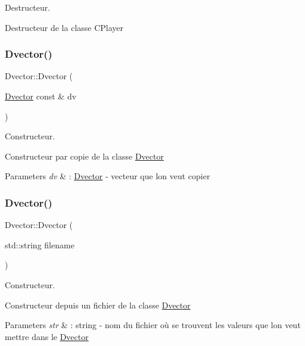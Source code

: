 Destructeur. 

Destructeur de la classe C\+Player \hypertarget{class_dvector_a7040a6dc6feb57dd2c5b7033c00e5de5}{}\label{class_dvector_a7040a6dc6feb57dd2c5b7033c00e5de5} 
\subsubsection{\texorpdfstring{Dvector()}{Dvector()}\hspace{0.1cm}{\footnotesize\ttfamily [2/3]}}
{\footnotesize\ttfamily Dvector\+::\+Dvector (\begin{DoxyParamCaption}\item[{\hyperlink{class_dvector}{Dvector} const \&}]{dv }\end{DoxyParamCaption})}



Constructeur. 

Constructeur par copie de la classe \hyperlink{class_dvector}{Dvector}


\begin{DoxyParams}{Parameters}
{\em dv} & \+: \hyperlink{class_dvector}{Dvector} -\/ vecteur que l\textquotesingle{}on veut copier \\
\hline
\end{DoxyParams}
\hypertarget{class_dvector_ab7046502bfc8889846cfdcb4499398cb}{}\label{class_dvector_ab7046502bfc8889846cfdcb4499398cb} 
\subsubsection{\texorpdfstring{Dvector()}{Dvector()}\hspace{0.1cm}{\footnotesize\ttfamily [3/3]}}
{\footnotesize\ttfamily Dvector\+::\+Dvector (\begin{DoxyParamCaption}\item[{std\+::string}]{filename }\end{DoxyParamCaption})}



Constructeur. 

Constructeur depuis un fichier de la classe \hyperlink{class_dvector}{Dvector}


\begin{DoxyParams}{Parameters}
{\em str} & \+: string -\/ nom du fichier où se trouvent les valeurs que l\textquotesingle{}on veut mettre dans le \hyperlink{class_dvector}{Dvector} \\
\hline
\end{DoxyParams}


